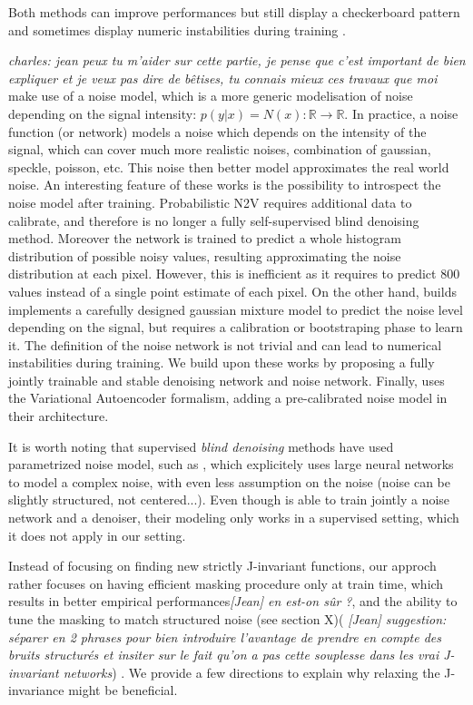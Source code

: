 \documentclass{article}
\begin{document}
Both methods can improve performances but still display a checkerboard pattern and sometimes display numeric instabilities during training \cite{2020DivNoising}.

\textit{charles: jean peux tu m'aider sur cette partie, je pense que c'est important de bien expliquer et je veux pas dire de bêtises, tu connais mieux ces travaux que moi}
\cite{krull2019probabilistic,prakash2020fully,2020DivNoising} make use of a noise model, which is a more generic modelisation of noise depending on the signal intensity: $p(y|x) = N(x): \mathbb{R} \to \mathbb{R}$. In practice, a noise function (or network)  models a noise which depends on the intensity of the signal, which can cover much more realistic noises, combination of gaussian, speckle, poisson, etc. This noise then better model approximates the real world noise. An interesting feature of these works is the possibility to introspect the noise model after training.
Probabilistic N2V \cite{krull2019probabilistic} requires additional data to calibrate, and therefore is no longer a fully self-supervised blind denoising method. Moreover the network is trained to predict a whole histogram distribution of possible noisy values, resulting approximating the noise distribution at each pixel. However, this is inefficient as it requires to predict $800$ values instead of a single point estimate of each pixel. On the other hand, \cite{prakash2020fully} builds implements a carefully designed gaussian mixture model to predict the noise level depending on the signal, but requires a calibration or bootstraping phase to learn it. The definition of the noise network is not trivial and can lead to numerical instabilities during training.
We build upon these works by proposing a fully jointly trainable and stable denoising network and noise network.
Finally, \cite{2020DivNoising} uses the Variational Autoencoder formalism, adding a pre-calibrated noise model in their architecture.

It is worth noting that supervised \textit{blind denoising} methods have used parametrized noise model, such as \cite{zhang2017beyond,yue2019variational}, which explicitely uses large neural networks to model a complex noise, with even less assumption on the noise (noise can be slightly structured, not centered...). Even though \cite{yue2019variational} is able to train jointly a noise network and a denoiser, their modeling only works in a supervised setting, which it does not apply in our setting.

Instead of focusing on finding new strictly J-invariant functions, our approch rather focuses on having efficient masking procedure only at train time, which results in better empirical performances\textit{[Jean] en est-on sûr ?}, and the ability to tune the masking to match structured noise (see section X)(\cite{broaddus2020removing} \textit{[Jean] suggestion: séparer en 2 phrases pour bien introduire l'avantage de prendre en compte des bruits structurés et insiter sur le fait qu'on a pas cette souplesse dans les vrai J-invariant networks}) . We provide a few directions to explain why relaxing the J-invariance might be beneficial.
\end{document}
